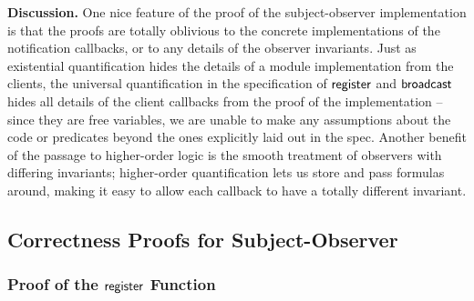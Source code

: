 \textbf{Discussion.} One nice feature of the proof of the
subject-observer implementation is that the proofs are totally
oblivious to the concrete implementations of the notification
callbacks, or to any details of the observer invariants. Just as
existential quantification hides the details of a module
implementation from the clients, the universal quantification in the
specification of $\mathsf{register}$ and $\mathsf{broadcast}$ hides all
details of the client callbacks from the proof of the implementation
-- since they are free variables, we are unable to make any
assumptions about the code or predicates beyond the ones explicitly
laid out in the spec. Another benefit of the passage to higher-order
logic is the smooth treatment of observers with differing invariants;
higher-order quantification lets us store and pass formulas around,
making it easy to allow each callback to have a totally different
invariant. 

\subsection{Correctness Proofs for Subject-Observer}

\subsubsection{Proof of the $\mathsf{register}$ Function}

